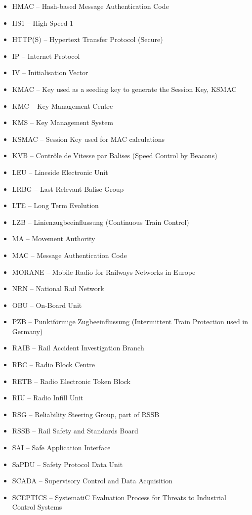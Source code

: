 \documentclass[twoside,11pt,a4paper]{article}
\begin{document}
\begin{itemize}[nolistsep]
\item HMAC -- Hash-based Message Authentication Code
\item HS1 -- High Speed 1
\item HTTP(S) -- Hypertext Transfer Protocol (Secure)
\item IP -- Internet Protocol
\item IV -- Initialisation Vector
\item KMAC -- Key used as a seeding key to generate the Session Key, KSMAC
\item KMC -- Key Management Centre
\item KMS -- Key Management System
\item KSMAC -- Session Key used for MAC calculations
\item KVB -- Contr\^ole de Vitesse par Balises (Speed Control by Beacons)
\item LEU -- Lineside Electronic Unit
\item LRBG -- Last Relevant Balise Group
\item LTE -- Long Term Evolution
\item LZB -- Linienzugbeeinflussung (Continuous Train Control)
\item MA -- Movement Authority
\item MAC -- Message Authentication Code
\item MORANE -- Mobile Radio for Railways Networks in Europe
\item NRN -- National Rail Network
\item OBU -- On-Board Unit
\item PZB -- Punktf\"ormige Zugbeeinflussung (Intermittent Train Protection used in Germany)
\item RAIB -- Rail Accident Investigation Branch
\item RBC -- Radio Block Centre
\item RETB -- Radio Electronic Token Block
\item RIU -- Radio Infill Unit
\item RSG -- Reliability Steering Group, part of RSSB
\item RSSB -- Rail Safety and Standards Board
\item SAI -- Safe Application Interface
\item SaPDU -- Safety Protocol Data Unit
\item SCADA -- Supervisory Control and Data Acquisition
\item SCEPTICS -- SystematiC Evaluation Process for Threats to Industrial Control Systems

\end{itemize}
\end{document}
